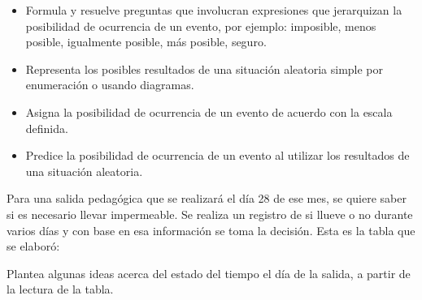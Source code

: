 \evidencias

\begin{itemize}
  \item Formula y resuelve preguntas que involucran expresiones que jerarquizan la posibilidad de ocurrencia de un evento, por ejemplo: imposible, menos posible, igualmente posible, más posible, seguro.
  \item Representa los posibles resultados de una situación aleatoria simple por enumeración o usando diagramas.
  \item Asigna la posibilidad de ocurrencia de un evento de acuerdo con la escala definida.
  \item Predice la posibilidad de ocurrencia de un evento al utilizar los resultados de una situación aleatoria.
\end{itemize}

\ejemplo

Para una salida pedagógica que se realizará el día 28 de ese mes, se quiere saber si es necesario llevar impermeable. Se realiza un registro de si llueve o no durante varios días y con base en esa información se toma la decisión. Esta es la tabla que se elaboró:


Plantea algunas ideas acerca del estado del tiempo el día de la salida, a partir de la lectura de la tabla.

